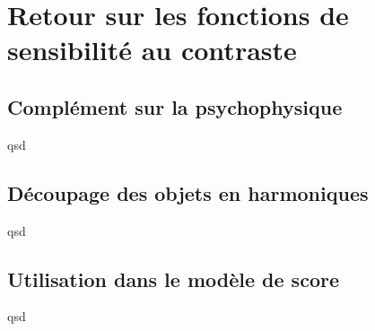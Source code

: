 \chapter{Retour sur les fonctions de sensibilité au contraste}
	\section{Complément sur la psychophysique}
	\par qsd
	
	\section{Découpage des objets en harmoniques}
	\par qsd
	
	\section{Utilisation dans le modèle de score}
	\par qsd